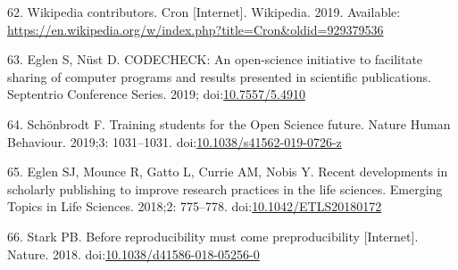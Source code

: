 \documentclass[10pt,letterpaper]{article}
\begin{document}
\leavevmode\hypertarget{ref-wikipedia_contributors_cron_2019}{}%
62. Wikipedia contributors. Cron {[}Internet{]}. Wikipedia. 2019.
Available:
\url{https://en.wikipedia.org/w/index.php?title=Cron\&oldid=929379536}

\leavevmode\hypertarget{ref-eglen_codecheck_2019}{}%
63. Eglen S, Nüst D. CODECHECK: An open-science initiative to facilitate
sharing of computer programs and results presented in scientific
publications. Septentrio Conference Series. 2019;
doi:\href{https://doi.org/10.7557/5.4910}{10.7557/5.4910}

\leavevmode\hypertarget{ref-schonbrodt_training_2019}{}%
64. Schönbrodt F. Training students for the Open Science future. Nature
Human Behaviour. 2019;3: 1031--1031.
doi:\href{https://doi.org/10.1038/s41562-019-0726-z}{10.1038/s41562-019-0726-z}

\leavevmode\hypertarget{ref-eglen_recent_2018}{}%
65. Eglen SJ, Mounce R, Gatto L, Currie AM, Nobis Y. Recent developments
in scholarly publishing to improve research practices in the life
sciences. Emerging Topics in Life Sciences. 2018;2: 775--778.
doi:\href{https://doi.org/10.1042/ETLS20180172}{10.1042/ETLS20180172}

\leavevmode\hypertarget{ref-stark_before_2018}{}%
66. Stark PB. Before reproducibility must come preproducibility
{[}Internet{]}. Nature. 2018.
doi:\href{https://doi.org/10.1038/d41586-018-05256-0}{10.1038/d41586-018-05256-0}

\nolinenumbers
\end{document}
